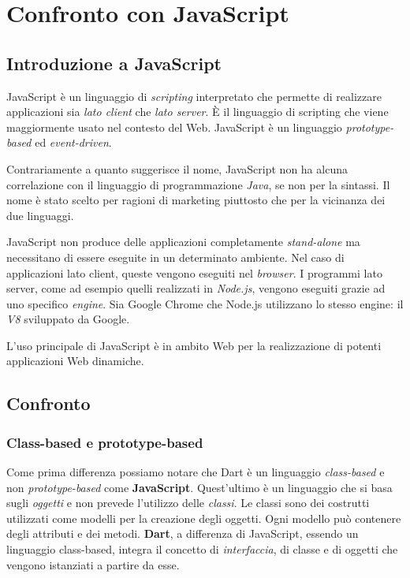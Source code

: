 \section{Confronto con JavaScript}

\subsection{Introduzione a JavaScript}
JavaScript è un linguaggio di \textit{scripting} interpretato che permette di realizzare applicazioni sia \textit{lato client} che \textit{lato server}. È il linguaggio di scripting che viene maggiormente usato nel contesto del Web. JavaScript è un linguaggio \textit{prototype-based} ed \textit{event-driven}.

Contrariamente a quanto suggerisce il nome, JavaScript non ha alcuna correlazione con il linguaggio di programmazione \textit{Java}, se non per la sintassi. Il nome è stato scelto per ragioni di marketing piuttosto che per la vicinanza dei due linguaggi.

JavaScript non produce delle applicazioni completamente \textit{stand-alone} ma necessitano di essere eseguite in un determinato ambiente. Nel caso di applicazioni lato client, queste vengono eseguiti nel \textit{browser}. I programmi lato server, come ad esempio quelli realizzati in \textit{Node.js}, vengono eseguiti grazie ad uno specifico \textit{engine}. Sia Google Chrome che Node.js utilizzano lo stesso engine: il \textit{V8} sviluppato da Google. 

L’uso principale di JavaScript è in ambito Web per la realizzazione di potenti applicazioni Web dinamiche.

\subsection{Confronto}

\subsubsection{Class-based e prototype-based}
Come prima differenza possiamo notare che Dart è un linguaggio \textit{class-based} e non \textit{prototype-based} come \textbf{JavaScript}. Quest'ultimo è un linguaggio che si basa sugli \textit{oggetti} e non prevede l’utilizzo delle \textit{classi}. Le classi sono dei costrutti utilizzati come modelli per la creazione degli oggetti. Ogni modello può contenere degli attributi e dei metodi.
\textbf{Dart}, a differenza di JavaScript, essendo un linguaggio class-based, integra il concetto di \textit{interfaccia}, di classe e di oggetti che vengono istanziati a partire da esse.

